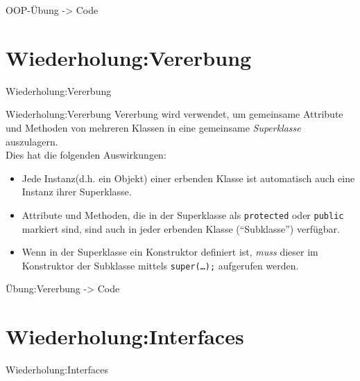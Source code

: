 \begin{frame}{OOP-Übung}
    -> Code
\end{frame}

\section{Wiederholung:Vererbung}
\begin{frame}{Wiederholung:Vererbung}
\end{frame}

\begin{frame}{Wiederholung:Vererbung}
    Vererbung wird verwendet, um gemeinsame Attribute und Methoden von mehreren Klassen in eine gemeinsame \textit{Superklasse} auszulagern. \\
    Dies hat die folgenden Auswirkungen:
    \begin{itemize}[<+->]
        \item Jede Instanz(d.h. ein Objekt) einer erbenden Klasse ist automatisch auch eine Instanz ihrer Superklasse.
        \item Attribute und Methoden, die in der Superklasse als \texttt{protected} oder \texttt{public} markiert sind, 
            sind auch in jeder erbenden Klasse (\enquote{Subklasse}) verfügbar.
        \item Wenn in der Superklasse ein Konstruktor definiert ist, \textit{muss} dieser im Konstruktor 
            der Subklasse mittels \texttt{super(\dots);} aufgerufen werden.
    \end{itemize}
\end{frame}

\begin{frame}{Übung:Vererbung}
    -> Code
\end{frame}

\section{Wiederholung:Interfaces}
\begin{frame}{Wiederholung:Interfaces}
\end{frame}

